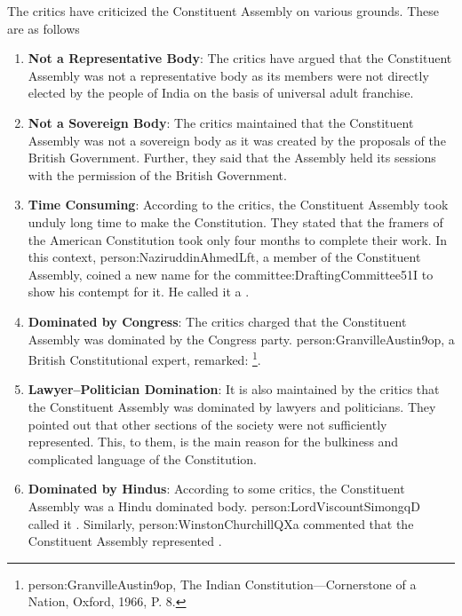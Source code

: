The critics have criticized the Constituent Assembly on various grounds. These are as follows

\begin{enumerate}
  \item \textbf{Not a Representative Body}: The critics have argued that the Constituent  Assembly was not a representative body as its members were not directly elected by the people of India on the basis of universal adult franchise.
  \item \textbf{Not a Sovereign Body}: The critics maintained that the Constituent Assembly was not a sovereign body as it was created by the proposals of the British Government. Further, they said that the Assembly held its sessions with the permission of the British Government.
  \item \textbf{Time Consuming}: According to the critics, the Constituent Assembly took unduly long time to make the Constitution. They stated that the framers of the American Constitution took only four months to complete their work. In this context, \gls{person:NaziruddinAhmedLft}, a member of the Constituent Assembly, coined a new name for the \gls{committee:DraftingCommittee51I} to show his contempt for it. He called it a .
  \item \textbf{Dominated by Congress}: The critics charged that the Constituent Assembly was dominated by the Congress party. \gls{person:GranvilleAustin9op}, a British Constitutional expert, remarked: \footnote{\gls{person:GranvilleAustin9op}, The Indian Constitution—Cornerstone of a Nation, Oxford, 1966, P. 8.}.
  \item \textbf{Lawyer–Politician Domination}: It is also maintained by the critics that the Constituent Assembly was dominated by lawyers and politicians. They pointed out that other sections of the society were not sufficiently represented. This, to them, is the main reason for the bulkiness and complicated language of the Constitution.
  \item \textbf{Dominated by Hindus}: According to some critics, the Constituent Assembly was a Hindu dominated body. \gls{person:LordViscountSimongqD} called it . Similarly, \gls{person:WinstonChurchillQXa} commented that the Constituent Assembly represented .
\end{enumerate}


